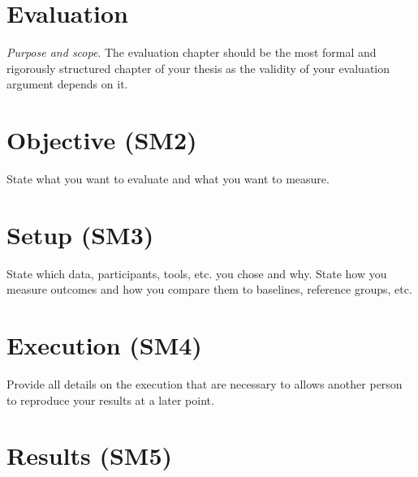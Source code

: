 \section{Evaluation}\label{sec:evaluation}

\emph{Purpose and scope}.
The evaluation chapter should be the most formal and rigorously structured chapter of your thesis as the validity of your evaluation argument depends on it.

\section{Objective (SM2)}\label{sec:evaluation:objective}

State what you want to evaluate and what you want to measure.

\section{Setup (SM3)}\label{sec:evaluation:setup}

State which data, participants, tools, etc. you chose and why.
State how you measure outcomes and how you compare them to baselines, reference groups, etc.

\section{Execution (SM4)}\label{sec:evaluation:execution}

Provide all details on the execution that are necessary to allows another person to reproduce your results at a later point.

\section{Results (SM5)}\label{sec:evaluation:results}

